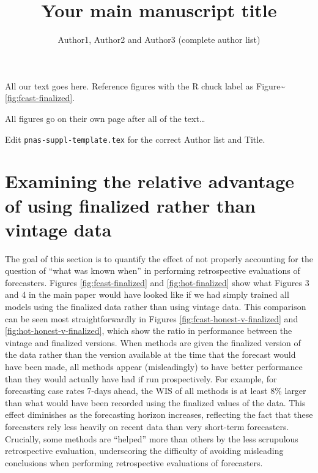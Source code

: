 \documentclass[9pt,twoside,lineno]{pnas-new}
\title{Your main manuscript title}
\author{Author1, Author2 and Author3 (complete author list)}
\begin{document}
\instructionspage

\maketitle

\SItext

All our text goes here. Reference figures with the R chuck label as
Figure\textasciitilde{}\ref{fig:fcast-finalized}.

All figures go on their own page after all of the text\ldots{}

Edit \texttt{pnas-suppl-template.tex} for the correct Author list and
Title.

\hypertarget{examining-the-relative-advantage-of-using-finalized-rather-than-vintage-data}{%
\section{Examining the relative advantage of using finalized rather than
vintage
data}\label{examining-the-relative-advantage-of-using-finalized-rather-than-vintage-data}}

The goal of this section is to quantify the effect of not properly
accounting for the question of ``what was known when'' in performing
retrospective evaluations of forecasters. Figures
\ref{fig:fcast-finalized} and \ref{fig:hot-finalized} show what Figures
3 and 4 in the main paper would have looked like if we had simply
trained all models using the finalized data rather than using vintage
data. This comparison can be seen most straightforwardly in Figures
\ref{fig:fcast-honest-v-finalized} and \ref{fig:hot-honest-v-finalized},
which show the ratio in performance between the vintage and finalized
versions. When methods are given the finalized version of the data
rather than the version available at the time that the forecast would
have been made, all methods appear (misleadingly) to have better
performance than they would actually have had if run prospectively. For
example, for forecasting case rates 7-days ahead, the WIS of all methods
is at least 8\% larger than what would have been recorded using the
finalized values of the data. This effect diminishes as the forecasting
horizon increases, reflecting the fact that these forecasters rely less
heavily on recent data than very short-term forecasters. Crucially, some
methods are ``helped'' more than others by the less scrupulous
retrospective evaluation, underscoring the difficulty of avoiding
misleading conclusions when performing retrospective evaluations of
forecasters.
\end{document}
